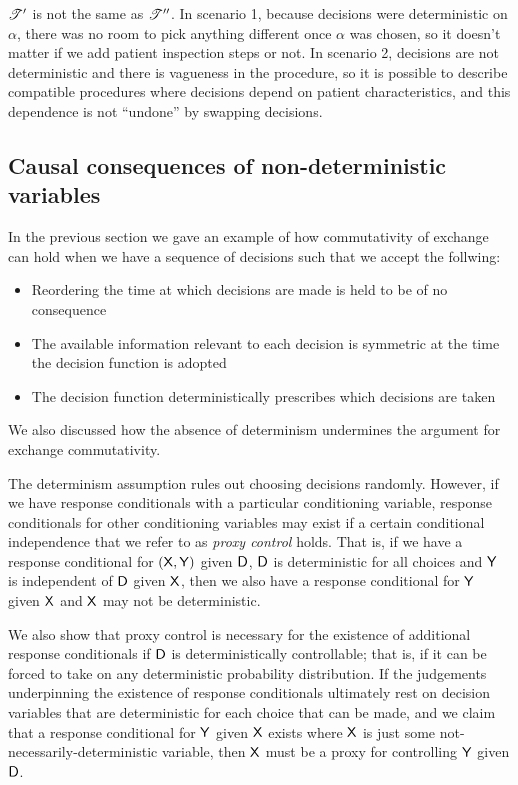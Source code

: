 $\mathscr{T}'$ is not the same as $\mathscr{T}''$. In scenario 1, because decisions were deterministic on $\alpha$, there was no room to pick anything different once $\alpha$ was chosen, so it doesn't matter if we add patient inspection steps or not. In scenario 2, decisions are not deterministic and there is vagueness in the procedure, so it is possible to describe compatible procedures where decisions depend on patient characteristics, and this dependence is not ``undone'' by swapping decisions.


\subsection{Causal consequences of non-deterministic variables}

In the previous section we gave an example of how commutativity of exchange can hold when we have a sequence of decisions such that we accept the follwing:

\begin{itemize}
    \item Reordering the time at which decisions are made is held to be of no consequence
    \item The available information relevant to each decision is symmetric at the time the decision function is adopted
    \item The decision function deterministically prescribes which decisions are taken
\end{itemize}

We also discussed how the absence of determinism undermines the argument for exchange commutativity.

The determinism assumption rules out choosing decisions randomly. However, if we have response conditionals with a particular conditioning variable, response conditionals for other conditioning variables may exist if a certain conditional independence that we refer to as \emph{proxy control} holds. That is, if we have a response conditional for $(\mathsf{X},\mathsf{Y})$ given $\mathsf{D}$, $\mathsf{D}$ is deterministic for all choices and $\mathsf{Y}$ is independent of $\mathsf{D}$ given $\mathsf{X}$, then we also have a response conditional for $\mathsf{Y}$ given $\mathsf{X}$ and $\mathsf{X}$ may not be deterministic.

We also show that proxy control is necessary for the existence of additional response conditionals if $\mathsf{D}$ is deterministically controllable; that is, if it can be forced to take on any deterministic probability distribution. If the judgements underpinning the existence of response conditionals ultimately rest on decision variables that are deterministic for each choice that can be made, and we claim that a response conditional for $\mathsf{Y}$ given $\mathsf{X}$ exists where $\mathsf{X}$ is just some not-necessarily-deterministic variable, then $\mathsf{X}$ must be a proxy for controlling $\mathsf{Y}$ given $\mathsf{D}$.


